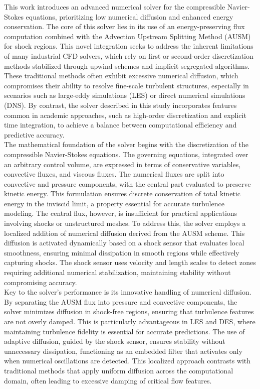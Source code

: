 \documentclass[a5paper]{sapthesis}
\begin{document}
	\noindent This work introduces an advanced numerical solver for the compressible Navier-Stokes equations, prioritizing low numerical diffusion and enhanced energy conservation. The core of this solver lies in its use of an energy-preserving flux computation combined with the Advection Upstream Splitting Method (AUSM) for shock regions. This novel integration seeks to address the inherent limitations of many industrial CFD solvers, which rely on first or second-order discretization methods stabilized through upwind schemes and implicit segregated algorithms. These traditional methods often exhibit excessive numerical diffusion, which compromises their ability to resolve fine-scale turbulent structures, especially in scenarios such as large-eddy simulations (LES) or direct numerical simulations (DNS). By contrast, the solver described in this study incorporates features common in academic approaches, such as high-order discretization and explicit time integration, to achieve a balance between computational efficiency and predictive accuracy.
	\\
	The mathematical foundation of the solver begins with the discretization of the compressible Navier-Stokes equations. The governing equations, integrated over an arbitrary control volume, are expressed in terms of conservative variables, convective fluxes, and viscous fluxes. The numerical fluxes are split into convective and pressure components, with the central part evaluated to preserve kinetic energy. This formulation ensures discrete conservation of total kinetic energy in the inviscid limit, a property essential for accurate turbulence modeling. The central flux, however, is insufficient for practical applications involving shocks or unstructured meshes. To address this, the solver employs a localized addition of numerical diffusion derived from the AUSM scheme. This diffusion is activated dynamically based on a shock sensor that evaluates local smoothness, ensuring minimal dissipation in smooth regions while effectively capturing shocks. The shock sensor uses velocity and length scales to detect zones requiring additional numerical stabilization, maintaining stability without compromising accuracy.
	\\
	Key to the solver’s performance is its innovative handling of numerical diffusion. By separating the AUSM flux into pressure and convective components, the solver minimizes diffusion in shock-free regions, ensuring that turbulence features are not overly damped. This is particularly advantageous in LES and DES, where maintaining turbulence fidelity is essential for accurate predictions. The use of adaptive diffusion, guided by the shock sensor, ensures stability without unnecessary dissipation, functioning as an embedded filter that activates only when numerical oscillations are detected. This localized approach contrasts with traditional methods that apply uniform diffusion across the computational domain, often leading to excessive damping of critical flow features.
\end{document}
